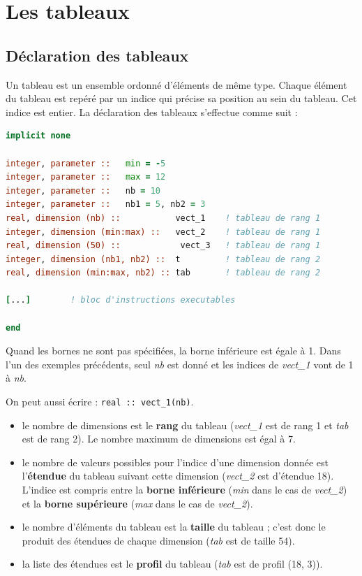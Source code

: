 \documentclass[a4paper,twoside]{article}
\begin{document}
\section{Les tableaux}
\subsection{Déclaration des tableaux}
Un tableau est un ensemble ordonné d'éléments de même type. Chaque élément du tableau est repéré par un indice qui précise sa position au sein du tableau. Cet indice est entier. La déclaration des tableaux s'effectue comme suit :
\begin{lstlisting}[language=Fortran]
implicit none 
  
integer, parameter ::   min = -5       
integer, parameter ::   max = 12        
integer, parameter ::   nb = 10       
integer, parameter ::   nb1 = 5, nb2 = 3       
real, dimension (nb) ::           vect_1    ! tableau de rang 1 
integer, dimension (min:max) ::   vect_2    ! tableau de rang 1
real, dimension (50) ::            vect_3   ! tableau de rang 1
integer, dimension (nb1, nb2) ::  t         ! tableau de rang 2    
real, dimension (min:max, nb2) :: tab       ! tableau de rang 2 

[...]        ! bloc d'instructions executables
 
end
\end{lstlisting}

\begin{remarque}
Quand les bornes ne sont pas spécifiées, la borne inférieure est égale à 1. Dans l'un des exemples précédents, seul \emph{nb} est donné et les indices de \emph{vect\_1} vont de 1 à \emph{nb}. 

On peut aussi écrire : \texttt{real :: vect\_1(nb)}.
\end{remarque}

\begin{itemize}
\item  le nombre de dimensions est le \textbf{rang} du tableau (\emph{vect\_1} est de rang 1 et \emph{tab} est de rang 2). Le nombre maximum de dimensions est égal à 7.

\item  le nombre de valeurs possibles pour l'indice d'une dimension donnée est l'\textbf{étendue} du tableau suivant cette dimension (\emph{vect\_2} est d'étendue 18). L'indice est compris entre la \textbf{borne inférieure} (\emph{min} dans le cas de \emph{vect\_2}) et la \textbf{borne supérieure} (\emph{max} dans le cas de \emph{vect\_2}).

\item  le nombre d'éléments du tableau est la \textbf{taille} du tableau ; c'est donc le produit des étendues de chaque dimension (\emph{tab} est de taille 54).

\item  la liste des étendues est le \textbf{profil} du tableau (\emph{tab} est de profil (18, 3)).
\end{itemize}
\end{document}
